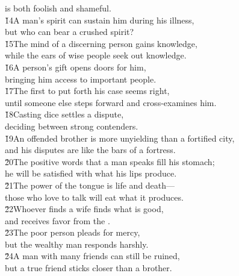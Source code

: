\begin{poetry}
\poemll    is both foolish and shameful. \\
\poeml \v{14}A man's spirit can sustain him during his illness, \\
\poemll    but who can bear a crushed spirit? \\
\poeml \v{15}The mind of a discerning person gains knowledge, \\
\poemll    while the ears of wise people seek out knowledge. \\
\poeml \v{16}A person's gift opens doors for him, \\
\poemll    bringing him access to important people. \\
\poeml \v{17}The first to put forth his case seems right, \\
\poemll    until someone else steps forward and cross-examines him. \\
\poeml \v{18}Casting dice settles a dispute, \\
\poemll    deciding between strong contenders. \\
\poeml \v{19}An offended brother is more unyielding than a fortified city, \\
\poemll    and his disputes are like the bars of a fortress. \\
\poeml \v{20}The positive words that a man speaks fill his stomach; \\
\poemll    he will be satisfied with what his lips produce. \\
\poeml \v{21}The power of the tongue is life and death--- \\
\poemll    those who love to talk will eat what it produces. \\
\poeml \v{22}Whoever finds a wife finds what is good, \\
\poemll    and receives favor from the . \\
\poeml \v{23}The poor person pleads for mercy, \\
\poemll    but the wealthy man responds harshly. \\
\poeml \v{24}A man with many friends can still be ruined, \\
\poemll    but a true friend sticks closer than a brother.
\end{poetry}


